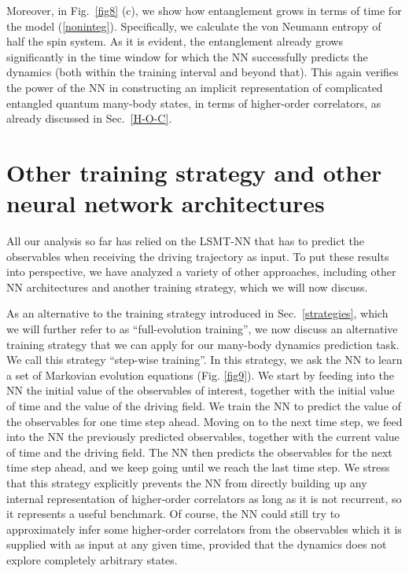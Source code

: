 \documentclass[a4paper,aps,amsmath,amssymb,twocolumn,longbibliography,,accepted=2022-05-17]{quantumarticle}
\begin{document}

Moreover, in Fig.~\ref{fig8} (c), we show how entanglement grows in terms of time for the model (\ref{noninteg}). Specifically, we calculate the von Neumann entropy of half the spin system. As it is evident, the entanglement already grows significantly in the time window for which the NN successfully predicts the dynamics (both within the training interval and beyond that). This again verifies the power of the NN in constructing an implicit representation of complicated entangled quantum many-body states,  in terms of higher-order correlators, as already discussed in  Sec.~\ref{H-O-C}.


\section{Other training strategy and other neural network architectures\label{archs}}


All our analysis so far has relied on the LSMT-NN that has to predict the observables when receiving the driving trajectory as input. To put these results into perspective, we have analyzed a variety of other approaches, including other NN architectures and another training strategy, which we will now discuss.

As an alternative to the training strategy introduced in Sec.~\ref{strategies}, which we will further refer to as ``full-evolution training'', we now discuss an alternative training strategy that we can apply for our many-body dynamics prediction task. We call  this strategy ``step-wise training''. In this strategy, we ask the NN to learn a set of Markovian evolution equations (Fig. \ref{fig9}). We start by feeding into the NN the initial value of the observables of interest, together with the initial value of time and the value of the driving field. We train the NN to predict the value of the observables for one time step ahead. Moving on to the next time step, we feed into the NN the previously predicted observables, together with the current value of time and the driving field. The NN then predicts the observables for the next time step ahead, and we keep going until we reach the last time step. We stress that this strategy explicitly prevents the NN from directly building up any internal representation of higher-order correlators as long as it is not recurrent, so it represents a useful benchmark. Of course, the NN could still try to approximately infer some higher-order correlators from the observables which it is supplied with as input at any given time, provided that the dynamics does not explore completely arbitrary states.
\end{document}
